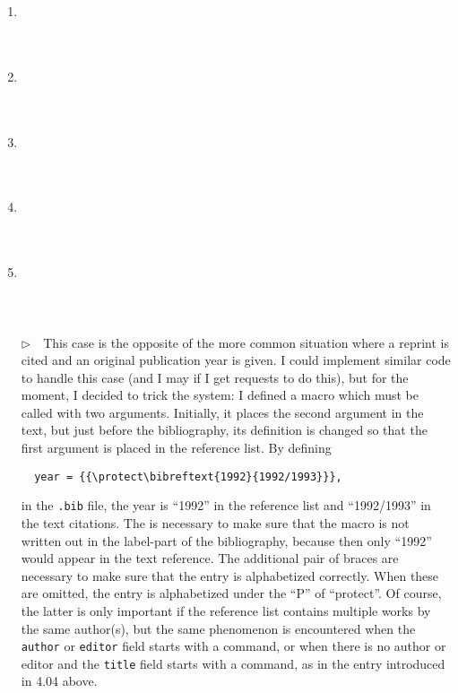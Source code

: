 \documentclass{article}
\newcommand{\bibreftext}[2]{#2}
\newcommand{\EM}{\ensuremath{\triangleright\quad}}
\newcommand{\fname}[1]{\texttt{#1}}%
\newcommand{\fieldname}[1]{\texttt{#1}}%
\newcommand{\cmd}[1]{\texttt{\string#1}}%
\begin{document}
\begin{enumerate}
      of braces and \verb+\emph+ in the title field.
\item \cite{ex13} \\ \cite{ex13}\\ \\ 
\item \cite{ex14} \\ \cite{ex14}\\ \\ 
\item \cite{ex15} \\ \cite{ex15}\\ \\ 
\item \cite{ex16} \\ \cite{ex16}\\ \\ 
\item \cite{ex17} \\ \cite{ex17}\\ \\ \\
      \EM This case is the opposite of the more common situation where a
      reprint is cited and an original publication year is given. I could
      implement similar code to handle this case (and I may if I get requests
      to do this), but for the moment, I decided to trick the system: I
      defined a macro \cmd{\bibreftext} which must be called with two
      arguments. Initially, it places the second argument in the text, but
      just before the bibliography, its definition is changed so that the
      first argument is placed in the reference list. By defining
\begin{verbatim}
  year = {{\protect\bibreftext{1992}{1992/1993}}},
\end{verbatim}
      in the \fname{.bib} file, the year is ``1992'' in the reference
      list and ``1992/1993'' in the text citations. The \cmd{\protect}
      is necessary to make sure that the \cmd{\bibreftext} macro is not
      written out in the label-part of the bibliography, because then
      only ``1992'' would appear in the text reference. The additional
      pair of braces are necessary to make sure that the entry
      is alphabetized correctly. When these are omitted, the entry
      is alphabetized under the ``P'' of ``protect''. Of course, the
      latter is only important if the reference list contains
      multiple works by the same author(s), but the same phenomenon
      is encountered when the \fieldname{author} or \fieldname{editor}
      field starts with a command, or when there is no author or editor
      and the \fieldname{title} field starts with a command, as in
      the entry  introduced in 4.04 above.


\end{enumerate}
\end{document}
